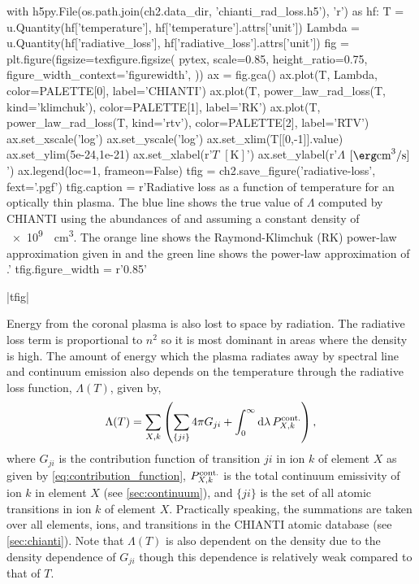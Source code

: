 \begin{pycode}[chapter2]
with h5py.File(os.path.join(ch2.data_dir, 'chianti_rad_loss.h5'), 'r') as hf:
    T = u.Quantity(hf['temperature'], hf['temperature'].attrs['unit'])
    Lambda = u.Quantity(hf['radiative_loss'], hf['radiative_loss'].attrs['unit'])
fig = plt.figure(figsize=texfigure.figsize(
    pytex,
    scale=0.85,
    height_ratio=0.75,
    figure_width_context='figurewidth',
))
ax = fig.gca()
ax.plot(T, Lambda, color=PALETTE[0], label='CHIANTI')
ax.plot(T, power_law_rad_loss(T, kind='klimchuk'), color=PALETTE[1], label='RK')
ax.plot(T, power_law_rad_loss(T, kind='rtv'), color=PALETTE[2], label='RTV')
ax.set_xscale('log')
ax.set_yscale('log')
ax.set_xlim(T[[0,-1]].value)
ax.set_ylim(5e-24,1e-21)
ax.set_xlabel(r'$T$ $[\si{\kelvin}]$')
ax.set_ylabel(r'$\Lambda$ $[\si{\erg\cubic\cm\per\second}]$')
ax.legend(loc=1, frameon=False)
tfig = ch2.save_figure('radiative-loss', fext='.pgf')
tfig.caption = r'Radiative loss as a function of temperature for an optically thin plasma. The blue line shows the true value of $\Lambda$ computed by CHIANTI using the abundances of \citet{feldman_potential_1992} and assuming a constant density of \SI{e9}{\per\cubic\cm}. The orange line shows the Raymond-Klimchuk (RK) power-law approximation given in \citet{klimchuk_highly_2008} and the green line shows the power-law approximation of \citet[RTV]{rosner_dynamics_1978}.'
tfig.figure_width = r'0.85\textwidth'
\end{pycode}
\py[chapter2]|tfig|

Energy from the coronal plasma is also lost to space by radiation. The radiative loss term is proportional to $n^2$ so it is most dominant in areas where the density is high. The amount of energy which the plasma radiates away by spectral line and continuum emission also depends on the temperature through the radiative loss function, $\Lambda(T)$, given by,
\begin{equation}\label{eq:rad-loss}
    \Lambda(T) = \sum_{X,k}\left(\sum_{\{ji\}}4\pi G_{ji}  + \int_0^\infty\textup{d}\lambda\,P_{X,k}^\textup{cont.} \right),
\end{equation}
where $G_{ji}$ is the contribution function of transition $ji$ in ion $k$ of element $X$ as given by \autoref{eq:contribution_function}, $P_{X,k}^\textup{cont.}$ is the total continuum emissivity of ion $k$ in element $X$ (see \autoref{sec:continuum}), and $\{ji\}$ is the set of all atomic transitions in ion $k$ of element $X$. Practically speaking, the summations are taken over all elements, ions, and transitions in the CHIANTI atomic database (see \autoref{sec:chianti}). Note that $\Lambda(T)$ is also dependent on the density due to the density dependence of $G_{ji}$ though this dependence is relatively weak compared to that of $T$.

